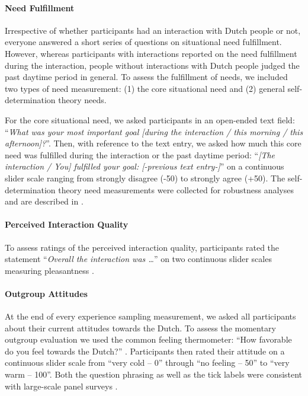 \paragraph{Need Fulfillment}

Irrespective of whether participants had an interaction with Dutch
people or not, everyone answered a short series of questions on
situational need fulfillment. However, whereas participants with
interactions reported on the need fulfillment during the interaction,
people without interactions with Dutch people judged the past daytime
period in general. To assess the fulfillment of needs, we included two
types of need measurement: (1) the core situational need and (2) general
self-determination theory needs.

For the core situational need, we asked participants in an open-ended
text field:
``\textit{What was your most important goal [during the interaction / this morning / this afternoon]?}''.
Then, with reference to the text entry, we asked how much this core need
was fulfilled during the interaction or the past daytime period:
``\textit{[The interaction / You] fulfilled your goal: [-previous text entry-]}''
on a continuous slider scale ranging from strongly disagree (-50) to
strongly agree (+50). The self-determination theory need measurements
were collected for robustness analyses and are described in
.

\paragraph{Perceived Interaction Quality}

To assess ratings of the perceived interaction quality, participants
rated the statement ``\textit{Overall the interaction was …}'' on two
continuous slider scales measuring pleasantness
\citep[from unpleasant (-50) to pleasant (+50)) and meaningfulness (from superficial (-50) to meaningful (+50); both items adapted from][]{Downie2008}.

\paragraph{Outgroup Attitudes}

At the end of every experience sampling measurement, we asked all
participants about their current attitudes towards the Dutch. To assess
the momentary outgroup evaluation we used the common feeling
thermometer: ``How favorable do you feel towards the Dutch?''
\citep[][]{Lavrakas2008}. Participants then rated their attitude on a
continuous slider scale from ``very cold -- 0'' through ``no feeling --
50'' to ``very warm -- 100''. Both the question phrasing as well as the
tick labels were consistent with large-scale panel surveys
\citep[e.g.,][]{DeBell2010}.

